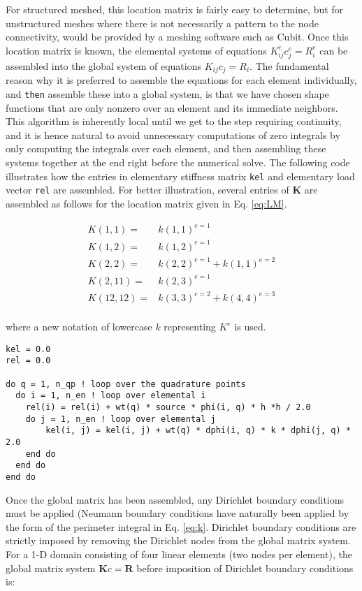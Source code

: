 \documentclass[10pt]{article}
\newcommand{\beqa}{\begin{equation}\begin{aligned}}
\newcommand{\eeqa}{\end{aligned}\end{equation}}
\begin{document}
For structured meshed, this location matrix is fairly easy to determine, but for unstructured meshes where there is not necessarily a pattern to the node connectivity, would be provided by a meshing software such as Cubit. Once this location matrix is known, the elemental systems of equations \(K_{ij}^ec_j^e=R_i^e\) can be assembled into the global system of equations \(K_{ij}c_j=R_i\). The fundamental reason why it is preferred to assemble the equations for each element individually, and {\tt then} assemble these into a global system, is that we have chosen shape functions that are only nonzero over an element and its immediate neighbors. This algorithm is inherently local until we get to the step requiring continuity, and it is hence natural to avoid unnecessary computations of zero integrals by only computing the integrals over each element, and then assembling these systems together at the end right before the numerical solve. The following code illustrates how the entries in elementary stiffness matrix {\tt kel} and elementary load vector {\tt rel} are assembled. For better illustration, several entries of \textbf{K} are assembled as follows for the location matrix given in Eq. \eqref{eq:LM}.

\beqa
K(1, 1) =& k(1, 1)^{e=1}\\
K(1, 2) =& k(1, 2)^{e=1}\\
K(2, 2) =& k(2, 2)^{e=1}+k(1, 1)^{e=2}\\
K(2, 11) =& k(2, 3)^{e=1}\\
K(12, 12) =& k(3, 3)^{e=2}+k(4, 4)^{e=3}\\
\eeqa

where a new notation of lowercase \(k\) representing \(K^e\) is used.

\begin{lstlisting}
kel = 0.0
rel = 0.0

do q = 1, n_qp ! loop over the quadrature points
  do i = 1, n_en ! loop over elemental i
    rel(i) = rel(i) + wt(q) * source * phi(i, q) * h *h / 2.0
    do j = 1, n_en ! loop over elemental j
        kel(i, j) = kel(i, j) + wt(q) * dphi(i, q) * k * dphi(j, q) * 2.0
    end do
  end do
end do
\end{lstlisting}

Once the global matrix has been assembled, any Dirichlet boundary conditions must be applied (Neumann boundary conditions have naturally been applied by the form of the perimeter integral in Eq. \eqref{eq:k}. Dirichlet boundary conditions are strictly imposed by removing the Dirichlet nodes from the global matrix system. For a 1-D domain consisting of four linear elements (two nodes per element), the global matrix system \(\textbf{K}c=\textbf{R}\) before imposition of Dirichlet boundary conditions is:
\end{document}
